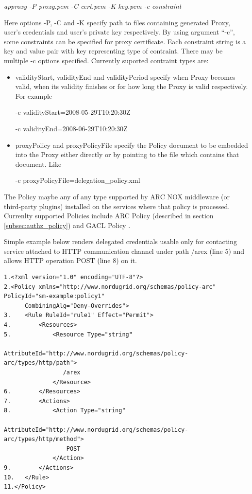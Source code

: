 \documentclass{article}                            %
\begin{document}
\emph{approxy -P proxy.pem -C cert.pem -K key.pem -c constraint}

Here options -P, -C and -K specify path to files containing generated Proxy, user's credentials and user's private key respectively. By using argument ``-c'', some constraints can be specified for proxy certificate. Each constraint string is a key and value pair with key representing type of contraint. There may be multiple -c options specified.  Currently suported contraint types are:

    \begin{itemize}
        \item validityStart, validityEnd and validityPeriod  specify when Proxy becomes valid, when its validity finishes or for how long the Proxy is valid respectively. For example

-c validityStart=2008-05-29T10:20:30Z

-c validityEnd=2008-06-29T10:20:30Z

        \item proxyPolicy and proxyPolicyFile specify the Policy document to be embedded into the Proxy either directly or by pointing to the file which contains that document. Like

-c proxyPolicyFile=delegation\_policy.xml
    \end{itemize}

The Policy maybe any of any type supported by ARC NOX middleware (or third-party plugins) installed on the services where that policy is processed. Currenlty supported Policies include ARC Policy (described in section \ref{subsec:authz_policy}) and GACL Policy \cite{gacl}.

Simple example below renders delegated credentials usable only for contacting service attached to HTTP communication channel under path /arex (line 5)  and allows HTTP operation POST (line 8) on it.

\begin{verbatim}
1.<?xml version="1.0" encoding="UTF-8"?>
2.<Policy xmlns="http://www.nordugrid.org/schemas/policy-arc" PolicyId="sm-example:policy1"
      CombiningAlg="Deny-Overrides">
3.    <Rule RuleId="rule1" Effect="Permit">
4.        <Resources>
5.            <Resource Type="string"
                  AttributeId="http://www.nordugrid.org/schemas/policy-arc/types/http/path">
                 /arex
              </Resource>
6.        </Resources>
7.        <Actions>
8.            <Action Type="string"
                  AttributeId="http://www.nordugrid.org/schemas/policy-arc/types/http/method">
                  POST
              </Action>
9.        </Actions>
10.   </Rule>
11.</Policy>
\end{verbatim}
\end{document}
